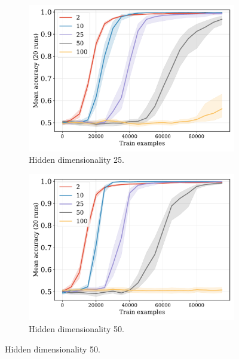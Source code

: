 \documentclass[12pt]{article}
\begin{document}
\begin{figure}[H]
  \begin{subfigure}{0.45\linewidth}
    \includegraphics[width=1\textwidth]{fig/flatpremack-h2-train_size-embed_dim-hidden_dim=25.pdf}
    \caption{Hidden dimensionality 25.}
  \end{subfigure}
  \hfill
  \begin{subfigure}{0.45\linewidth}
    \includegraphics[width=1\textwidth]{fig/flatpremack-h2-train_size-embed_dim-hidden_dim=50.pdf}
    \caption{Hidden dimensionality 50.}
  \end{subfigure}


\end{figure}
\end{document}
